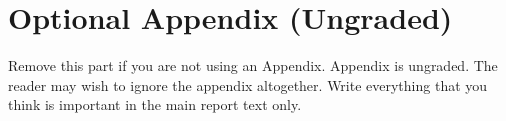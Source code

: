 \documentclass{article}
\begin{document}





\appendix
\section{Optional Appendix (Ungraded)}
Remove this part if you are not using an Appendix. Appendix is ungraded. The
reader may wish to ignore the appendix altogether. Write everything that you
think is important in the main report text only.

\end{document}
